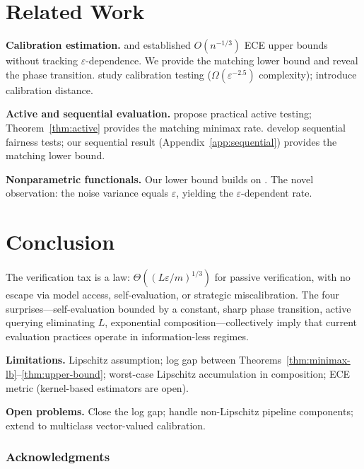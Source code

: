 \documentclass{article}
\newcommand{\Lip}{L}
\newcommand{\errrate}{\varepsilon}
\newcommand{\nsamples}{m}
\theoremstyle{definition}
\begin{document}
\section{Related Work}
\label{sec:related}

\textbf{Calibration estimation.} \citet{sun2023recalibration} and \citet{futami2024information} established $O(n^{-1/3})$ ECE upper bounds without tracking $\errrate$-dependence. We provide the matching lower bound and reveal the phase transition. \citet{hu2024testing} study calibration testing ($\Omega(\errrate^{-2.5})$ complexity); \citet{blasiok2023calibration} introduce calibration distance.

\textbf{Active and sequential evaluation.} \citet{kossen2021active} propose practical active testing; Theorem~\ref{thm:active} provides the matching minimax rate. \citet{shekhar2024fairness} develop sequential fairness tests; our sequential result (Appendix~\ref{app:sequential}) provides the matching lower bound.

\textbf{Nonparametric functionals.} Our lower bound builds on \citet{lepski1999estimation}. The novel observation: the noise variance equals $\errrate$, yielding the $\errrate$-dependent rate.

\section{Conclusion}
\label{sec:conclusion}

The verification tax is a law: $\Theta((\Lip\errrate/\nsamples)^{1/3})$ for passive verification, with no escape via model access, self-evaluation, or strategic miscalibration. The four surprises---self-evaluation bounded by a constant, sharp phase transition, active querying eliminating $\Lip$, exponential composition---collectively imply that current evaluation practices operate in information-less regimes.

\textbf{Limitations.} Lipschitz assumption; log gap between Theorems~\ref{thm:minimax-lb}--\ref{thm:upper-bound}; worst-case Lipschitz accumulation in composition; ECE metric (kernel-based estimators are open).

\textbf{Open problems.} Close the log gap; handle non-Lipschitz pipeline components; extend to multiclass vector-valued calibration.

\subsubsection*{Acknowledgments}
\end{document}
